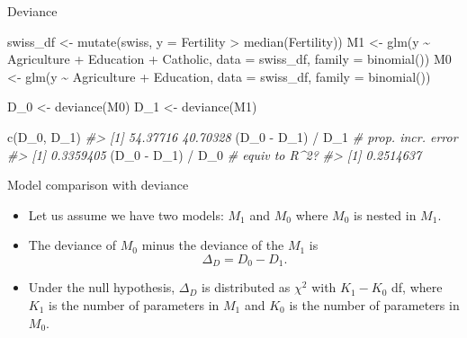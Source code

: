 \documentclass[
  10pt,
  ignorenonframetext,
]{beamer}
\newenvironment{Shaded}{\begin{snugshade}}{\end{snugshade}}
\newcommand{\AttributeTok}[1]{\textcolor[rgb]{0.77,0.63,0.00}{#1}}
\newcommand{\CommentTok}[1]{\textcolor[rgb]{0.56,0.35,0.01}{\textit{#1}}}
\newcommand{\FunctionTok}[1]{\textcolor[rgb]{0.00,0.00,0.00}{#1}}
\newcommand{\NormalTok}[1]{#1}
\newcommand{\OtherTok}[1]{\textcolor[rgb]{0.56,0.35,0.01}{#1}}
\newcommand{\SpecialCharTok}[1]{\textcolor[rgb]{0.00,0.00,0.00}{#1}}
\begin{document}
\begin{frame}[fragile]{Deviance}
\protect\hypertarget{deviance-1}{}
\begin{Shaded}
\begin{Highlighting}[]
\NormalTok{swiss\_df }\OtherTok{\textless{}{-}} \FunctionTok{mutate}\NormalTok{(swiss, }\AttributeTok{y =}\NormalTok{ Fertility }\SpecialCharTok{\textgreater{}} \FunctionTok{median}\NormalTok{(Fertility))}
\NormalTok{M1 }\OtherTok{\textless{}{-}} \FunctionTok{glm}\NormalTok{(y }\SpecialCharTok{\textasciitilde{}}\NormalTok{ Agriculture }\SpecialCharTok{+}\NormalTok{ Education }\SpecialCharTok{+}\NormalTok{ Catholic, }
          \AttributeTok{data =}\NormalTok{ swiss\_df, }\AttributeTok{family =} \FunctionTok{binomial}\NormalTok{())}
\NormalTok{M0 }\OtherTok{\textless{}{-}} \FunctionTok{glm}\NormalTok{(y }\SpecialCharTok{\textasciitilde{}}\NormalTok{ Agriculture }\SpecialCharTok{+}\NormalTok{ Education, }\AttributeTok{data =}\NormalTok{ swiss\_df, }
          \AttributeTok{family =} \FunctionTok{binomial}\NormalTok{())}

\NormalTok{D\_0 }\OtherTok{\textless{}{-}} \FunctionTok{deviance}\NormalTok{(M0)}
\NormalTok{D\_1 }\OtherTok{\textless{}{-}} \FunctionTok{deviance}\NormalTok{(M1)}

\FunctionTok{c}\NormalTok{(D\_0, D\_1)}
\CommentTok{\#\textgreater{} [1] 54.37716 40.70328}
\NormalTok{(D\_0 }\SpecialCharTok{{-}}\NormalTok{ D\_1) }\SpecialCharTok{/}\NormalTok{ D\_1 }\CommentTok{\# prop. incr. error}
\CommentTok{\#\textgreater{} [1] 0.3359405}
\NormalTok{(D\_0 }\SpecialCharTok{{-}}\NormalTok{ D\_1) }\SpecialCharTok{/}\NormalTok{ D\_0 }\CommentTok{\# equiv to R\^{}2?}
\CommentTok{\#\textgreater{} [1] 0.2514637}
\end{Highlighting}
\end{Shaded}
\end{frame}

\begin{frame}{Model comparison with deviance}
\protect\hypertarget{model-comparison-with-deviance}{}
\begin{itemize}
\item
  Let us assume we have two models: \(M_1\) and \(M_0\) where \(M_0\) is
  nested in \(M_1\).
\item
  The deviance of \(M_0\) minus the deviance of the \(M_1\) is
  \[\Delta_{D} = D_0 - D_1.\]
\item
  Under the null hypothesis, \(\Delta_D\) is distributed as \(\chi^2\)
  with \(K_1 - K_0\) df, where \(K_1\) is the number of parameters in
  \(M_1\) and \(K_0\) is the number of parameters in \(M_0\).
\end{itemize}
\end{frame}
\end{document}
